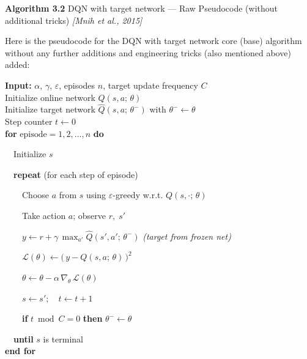 \documentclass[11pt]{article}
\begin{document}
    \label{pseudo-3-2}

    \begin{pseudobox}

\textbf{Algorithm 3.2} DQN with target network --- Raw Pseudocode
(without additional tricks) \emph{{[}Mnih et al., 2015{]}}

\tcbline

Here is the pseudocode for the DQN with target network core (base)
algorithm without any further additions and engineering tricks (also
mentioned above) added:

\textbf{Input:} \(\alpha\), \(\gamma\), \(\varepsilon\), episodes \(n\),
target update frequency \(C\)\\
Initialize online network \(Q(s, a;\, \theta)\)\\
Initialize target network \(\hat{Q}(s, a;\, \theta^{-})\) with
\(\theta^{-} \leftarrow \theta\)\\
Step counter \(t \leftarrow 0\)\\
\textbf{for} \(\text{episode} = 1, 2, \ldots, n\) \textbf{do}\\
\strut ~~Initialize \(s\)\\
\strut ~~\textbf{repeat} (for each step of episode)\\
\strut ~~~~Choose \(a\) from \(s\) using \(\varepsilon\)-greedy w.r.t.
\(Q(s, \cdot;\, \theta)\)\\
\strut ~~~~Take action \(a\); observe \(r,\; s'\)\\
\strut ~~~~\(y \leftarrow r + \gamma\, \max_{a'} \hat{Q}(s', a';\, \theta^{-})\)
\emph{(target from frozen net)}\\
\strut ~~~~\(\mathcal{L}(\theta) \leftarrow \bigl(\, y - Q(s, a;\, \theta) \,\bigr)^{2}\)\\
\strut ~~~~\(\theta \leftarrow \theta - \alpha\, \nabla_{\theta}\, \mathcal{L}(\theta)\)\\
\strut ~~~~\(s \leftarrow s';\quad t \leftarrow t + 1\)\\
\strut ~~~~\textbf{if} \(t \bmod C = 0\) \textbf{then}
\(\theta^{-} \leftarrow \theta\)\\
\strut ~~\textbf{until} \(s\) is terminal\\
\textbf{end for}

\end{pseudobox}
\end{document}

